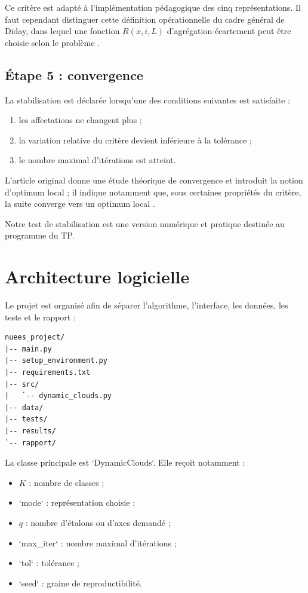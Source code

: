\documentclass[12pt,a4paper]{article}
\begin{document}
Ce critère est adapté à l'implémentation pédagogique des cinq représentations. Il faut cependant distinguer cette définition opérationnelle du cadre général de Diday, dans lequel une fonction $R(x,i,L)$ d'agrégation-écartement peut être choisie selon le problème \cite[p.~21]{diday1971}.

\subsection{Étape 5 : convergence}

La stabilisation est déclarée lorsqu'une des conditions suivantes est satisfaite :
\begin{enumerate}
    \item les affectations ne changent plus ;
    \item la variation relative du critère devient inférieure à la tolérance ;
    \item le nombre maximal d'itérations est atteint.
\end{enumerate}

L'article original donne une étude théorique de convergence et introduit la notion d'optimum local ; il indique notamment que, sous certaines propriétés du critère, la suite converge vers un optimum local \cite[p.~22--23]{diday1971}.

Notre test de stabilisation est une version numérique et pratique destinée au programme du TP.

\section{Architecture logicielle}

Le projet est organisé afin de séparer l'algorithme, l'interface, les données, les tests et le rapport :

\begin{verbatim}
nuees_project/
|-- main.py
|-- setup_environment.py
|-- requirements.txt
|-- src/
|   `-- dynamic_clouds.py
|-- data/
|-- tests/
|-- results/
`-- rapport/
\end{verbatim}

La classe principale est `DynamicClouds`. Elle reçoit notamment :
\begin{itemize}
    \item $K$ : nombre de classes ;
    \item `mode` : représentation choisie ;
    \item $q$ : nombre d'étalons ou d'axes demandé ;
    \item `max\_iter` : nombre maximal d'itérations ;
    \item `tol` : tolérance ;
    \item `seed` : graine de reproductibilité.
\end{itemize}
\end{document}
